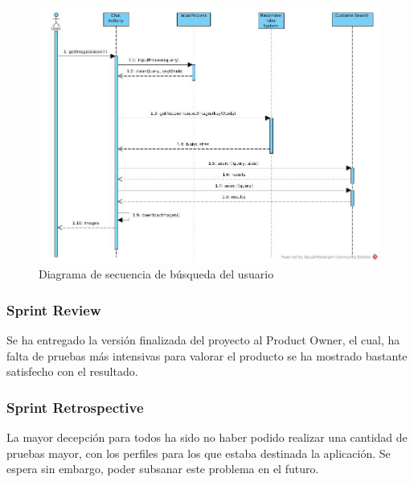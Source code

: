 \begin{figure}[!h]
\begin{center}
\includegraphics[width=1.1\textwidth]{./figures/ImageSearch.jpg}
\caption{Diagrama de secuencia de búsqueda del usuario}
\label{fig:ImageSearch}
\end{center}
\end{figure}

\subsubsection{Sprint Review}
Se ha entregado la versión finalizada del proyecto al Product Owner, el cual, ha falta de pruebas más intensivas para valorar el producto se ha mostrado bastante satisfecho con el resultado.


\subsubsection{Sprint Retrospective}
La mayor decepción para todos ha sido no haber podido realizar una cantidad de pruebas mayor, con los perfiles para los que estaba destinada la aplicación. Se espera sin embargo, poder subsanar este problema en el futuro.















